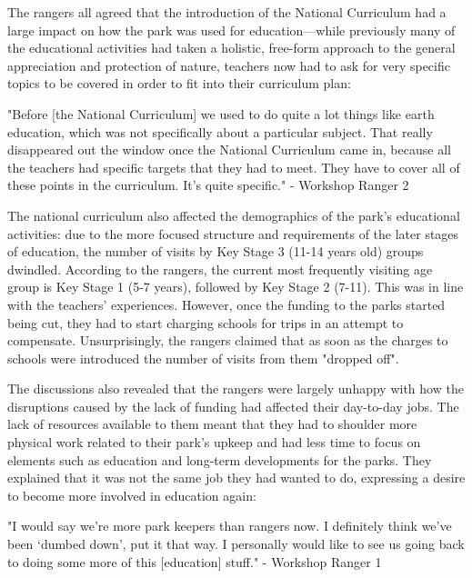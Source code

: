 The rangers all agreed that the introduction of the National Curriculum had a large impact on how the park was used for education---while previously many of the educational activities had taken a holistic, free-form approach to the general appreciation and protection of nature, teachers now had to ask for very specific topics to be covered in order to fit into their curriculum plan: 

\begin{displayquote}
"Before [the National Curriculum] we used to do quite a lot things like earth education, which was not specifically about a particular subject. That really disappeared out the window once the National Curriculum came in, because all the teachers had specific targets that they had to meet. They have to cover all of these points in the curriculum. It's quite specific." - Workshop Ranger 2
\end{displayquote}

The national curriculum also affected the demographics of the park’s educational activities: due to the more focused structure and requirements of the later stages of education, the number of visits by Key Stage 3 (11-14 years old) groups dwindled. According to the rangers, the current most frequently visiting age group is Key Stage 1 (5-7 years), followed by Key Stage 2 (7-11). This was in line with the teachers’ experiences. However, once the funding to the parks started being cut, they had to start charging schools for trips in an attempt to compensate. Unsurprisingly, the rangers claimed that as soon as the charges to schools were introduced the number of visits from them "dropped off".

The discussions also revealed that the rangers were largely unhappy with how the disruptions caused by the lack of funding had affected their day-to-day jobs. The lack of resources available to them meant that they had to shoulder more physical work related to their park’s upkeep and had less time to focus on elements such as education and long-term developments for the parks. They explained that it was not the same job they had wanted to do, expressing a desire to become more involved in education again:

\begin{displayquote}
"I would say we're more park keepers than rangers now. I definitely think we've been `dumbed down', put it that way. I personally would like to see us going back to doing some more of this [education] stuff." - Workshop Ranger 1
\end{displayquote}


